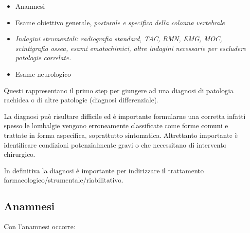 \begin{itemize}
\item
   
  Anamnesi

\item
   
  Esame obiettivo generale, \emph{posturale e specifico della colonna
  vertebrale}

\item
  \emph{Indagini strumentali: radiografia standard, TAC, RMN, EMG, MOC,
  scintigrafia ossea, esami ematochimici, altre indagini necessarie per
  escludere patologie correlate. }

\item
   
  Esame neurologico
   
\end{itemize}

Questi rappresentano il primo step per giungere ad una diagnosi di
patologia rachidea o di altre patologie (diagnosi differenziale).

La diagnosi può risultare difficile ed è importante formularne una
corretta infatti spesso le lombalgie vengono erroneamente classificate
come forme comuni e trattate in forma aspecifica, soprattutto
sintomatica. Altrettanto importante è identificare condizioni
potenzialmente gravi o che necessitano di intervento chirurgico.

In definitiva la diagnosi è importante per indirizzare il trattamento
farmacologico/strumentale/riabilitativo.

\subsection{Anamnesi}


Con l'anamnesi occorre:

